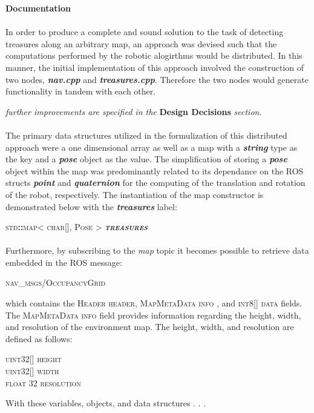 \documentclass[12pt]{article}
\begin{document}
{\setlength{\parindent}{0cm}
\textbf{Documentation} \\
\paragraph{} In order to produce a complete and sound solution to the task of detecting treasures along an arbitrary map, an approach was devised such that the computations performed by the robotic alogirthms would be distributed.
  In this manner, the initial implementation of this approach involved the construction of two nodes, \textbf{\textit{nav.cpp}} and \textbf{\textit{treasures.cpp}}. Therefore the two nodes would generate functionality in tandem with each other.
  \begin{center} \textit{further improvements are specified in the} \textbf{Design Decisions} \textit{section}. \end{center}
  \paragraph{} The primary data structures utilized in the formulization of this distributed approach were a one dimensional array as well as a map with a \textbf{\textit{string}} type as the key and a \textbf\textit{{pose}} object as the value.
  The simplification of storing a \textbf{\textit{pose}} object within the map was predominantly related to its dependance on the ROS structs \textit{\textbf{point}} and \textit{\textbf{quaternion}} for the computing of the translation and rotation of the robot, respectively.
  The instantiation of the map constructor is demonstrated below with the \textbf{\textit{treasures}} label:
  \begin{center} \textsc{std\textbf{::}map< char[], Pose > \textbf{\textit{treasures}}} \end{center}  
  \paragraph{} Furthermore, by subscribing to the \textit{map} topic it becomes possible to retrieve data embedded in the ROS message:
  \begin{center} \textsc{nav\_msgs/OccupancyGrid} \end{center}
  which contains the \textsc{Header header}, \textsc{MapMetaData info} , and \textsc{int}8[] \textsc{data} fields. The \textsc{MapMetaData info} field provides information regarding the height, width, and resolution of the environment map.
  The height, width, and resolution are defined as follows:
  \begin{center} \textsc{uint}32[] \textsc{height} \\ \textsc{uint}32[] \textsc{width} \\ \textsc{float} 32 \textsc{resolution} \end{center}
  With these variables, objects, and data structures . . . 
  \\\\
}
\end{document}
